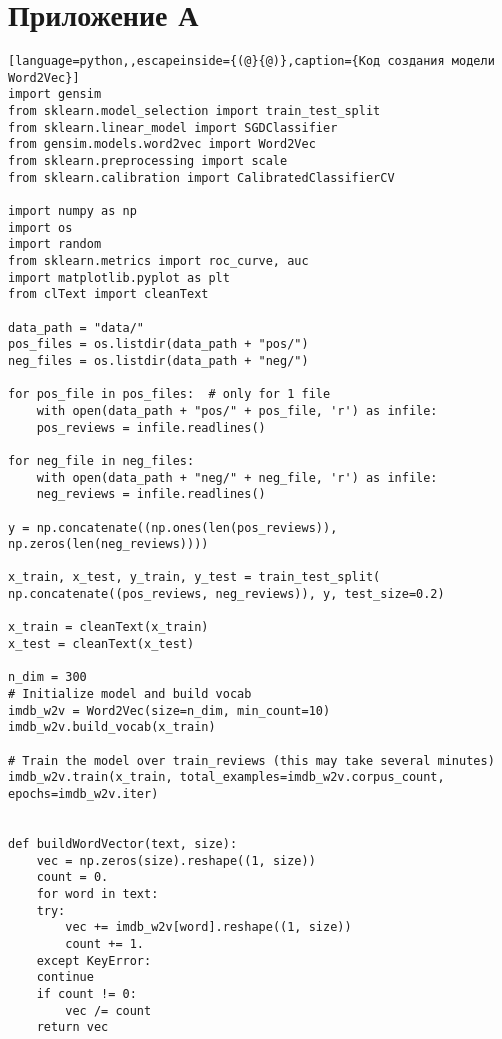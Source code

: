 \chapter{Приложение А}



\begin{lstlisting}[language=python,,escapeinside={(@}{@)},caption={Код создания модели Word2Vec}] 
import gensim
from sklearn.model_selection import train_test_split
from sklearn.linear_model import SGDClassifier
from gensim.models.word2vec import Word2Vec
from sklearn.preprocessing import scale
from sklearn.calibration import CalibratedClassifierCV

import numpy as np
import os
import random
from sklearn.metrics import roc_curve, auc
import matplotlib.pyplot as plt
from clText import cleanText

data_path = "data/"
pos_files = os.listdir(data_path + "pos/")
neg_files = os.listdir(data_path + "neg/")

for pos_file in pos_files:  # only for 1 file
	with open(data_path + "pos/" + pos_file, 'r') as infile:
	pos_reviews = infile.readlines()

for neg_file in neg_files:
	with open(data_path + "neg/" + neg_file, 'r') as infile:
	neg_reviews = infile.readlines()

y = np.concatenate((np.ones(len(pos_reviews)), np.zeros(len(neg_reviews))))

x_train, x_test, y_train, y_test = train_test_split(
np.concatenate((pos_reviews, neg_reviews)), y, test_size=0.2)

x_train = cleanText(x_train)
x_test = cleanText(x_test)

n_dim = 300
# Initialize model and build vocab
imdb_w2v = Word2Vec(size=n_dim, min_count=10)
imdb_w2v.build_vocab(x_train)

# Train the model over train_reviews (this may take several minutes)
imdb_w2v.train(x_train, total_examples=imdb_w2v.corpus_count,
epochs=imdb_w2v.iter)


def buildWordVector(text, size):
	vec = np.zeros(size).reshape((1, size))
	count = 0.
	for word in text:
	try:
		vec += imdb_w2v[word].reshape((1, size))
		count += 1.
	except KeyError:
	continue
	if count != 0:
		vec /= count
	return vec



\end{lstlisting}

